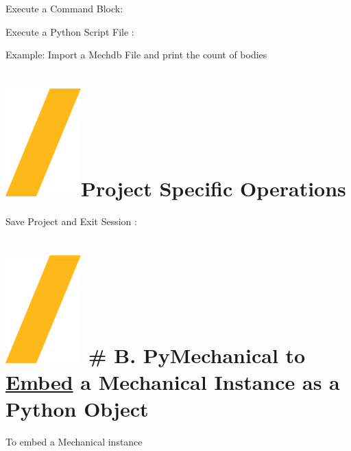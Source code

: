 \documentclass[9pt,landscape]{article}
\begin{document}
\begin{multicols}{3}

Execute a Command Block:


Execute a Python Script File :


Example: Import a Mechdb File and print the count of bodies



\vfill
\section{\includegraphics[height=\fontcharht\font`\S]{slash.png}Project Specific Operations}
Save Project and Exit Session :


\section{\includegraphics[height=\fontcharht\font`\S]{slash.png} # B. PyMechanical to \underline{Embed}  a Mechanical Instance as a Python Object}
To embed a Mechanical instance



\end{multicols}
\end{document}

